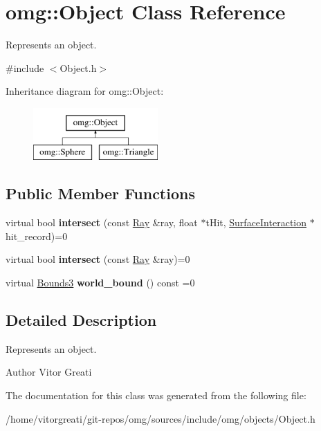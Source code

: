 \hypertarget{classomg_1_1_object}{}\section{omg\+::Object Class Reference}
\label{classomg_1_1_object}


Represents an object.  




{\ttfamily \#include $<$Object.\+h$>$}

Inheritance diagram for omg\+::Object\+:\begin{figure}[H]
\begin{center}
\leavevmode
\includegraphics[height=2.000000cm]{classomg_1_1_object}
\end{center}
\end{figure}
\subsection*{Public Member Functions}
\begin{DoxyCompactItemize}
\item 
\mbox{\label{classomg_1_1_object_a56354058785d04afff686ae41e144970}} 
virtual bool {\bfseries intersect} (const \mbox{\hyperlink{classomg_1_1_ray}{Ray}} \&ray, float $\ast$t\+Hit, \mbox{\hyperlink{classomg_1_1_surface_interaction}{Surface\+Interaction}} $\ast$hit\+\_\+record)=0
\item 
\mbox{\label{classomg_1_1_object_a6bea9275afdd17c67de345043bc0d3fc}} 
virtual bool {\bfseries intersect} (const \mbox{\hyperlink{classomg_1_1_ray}{Ray}} \&ray)=0
\item 
\mbox{\label{classomg_1_1_object_a571b05c10d7fb654449d68dda18b65e2}} 
virtual \mbox{\hyperlink{classomg_1_1_bounds3}{Bounds3}} {\bfseries world\+\_\+bound} () const =0
\end{DoxyCompactItemize}


\subsection{Detailed Description}
Represents an object. 

\begin{DoxyAuthor}{Author}
Vitor Greati 
\end{DoxyAuthor}


The documentation for this class was generated from the following file\+:\begin{DoxyCompactItemize}
\item 
/home/vitorgreati/git-\/repos/omg/sources/include/omg/objects/Object.\+h\end{DoxyCompactItemize}
